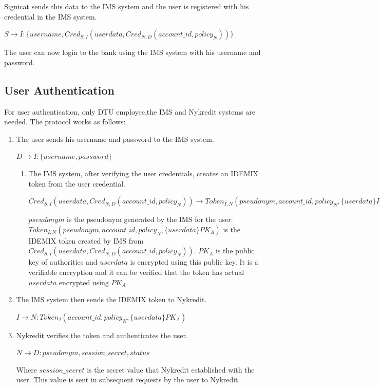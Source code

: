 \begin{enumerate}
Signicat sends this data to the IMS system and the user is registered with his credential in the IMS system.
\begin{center}
	$S \rightarrow I : \{username,Cred_{S,I}(userdata,Cred_{N,D}(account\_id,policy_N))\}$
\end{center}
The user can now login to the bank using the IMS system with his username and password.
\end{enumerate}

\subsection{User Authentication}
For user authentication, only DTU employee,the IMS and Nykredit systems are needed. The protocol works as follows:
\begin{enumerate}
	\item The user sends his username and password to the IMS system.
	\begin{center}
		$D \rightarrow I : \{username,password\}$
	\end{center}
	\begin{enumerate}
	\item The IMS system, after verifying the user credentials, creates an IDEMIX token from the user credential.
	\begin{center}
		$Cred_{S,I}(userdata,Cred_{N,D}(account\_id,policy_N)) \rightarrow Token_{I,N}(pseudonym,account\_id,policy_N,\{userdata\}PK_A)$
	\end{center}
	$pseudonym$ is the pseudonym generated by the IMS for the user. $Token_{I,N}(pseudonym,account\_id,policy_N,\{userdata\}PK_A)$ is the IDEMIX token created by IMS from $Cred_{S,I}(userdata,Cred_{N,D}(account\_id,policy_N))$. $PK_A$ is the public key of authorities and $userdata$ is encrypted using this public key. It is a verifiable encryption\cite{camenisch2003practical} and it can be verified that the token has actual $userdata$ encrypted using $PK_A$.
	\end{enumerate}
	\item The IMS system then sends the IDEMIX token to Nykredit. 
	\begin{center}
		$I \rightarrow N : Token_I(account\_id,policy_N,\{userdata\}PK_A)$
	\end{center}
	\item Nykredit verifies the token and authenticates the user.
	\begin{center}
		$N \rightarrow D : {pseudonym,session\_secret,status}$
	\end{center}
	Where $session\_secret$ is the secret value that Nykredit established with the user. This value is sent in subsequent requests by the user to Nykredit.
\end{enumerate}
